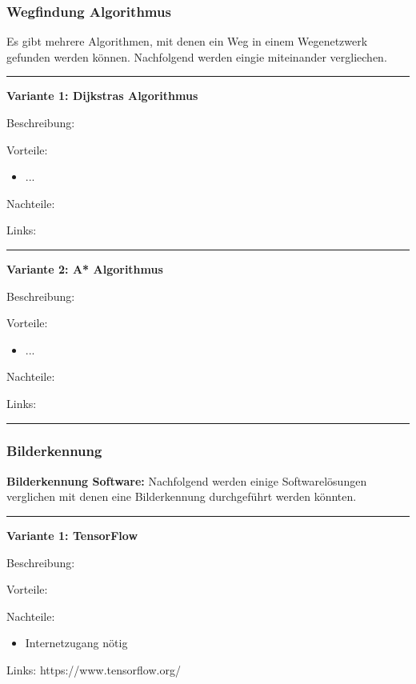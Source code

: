 \subsubsection{Wegfindung Algorithmus}

Es gibt mehrere Algorithmen, mit denen ein Weg in einem Wegenetzwerk gefunden werden können. Nachfolgend werden eingie miteinander vergliechen.

\vspace{10pt}
\hrule

\textbf{Variante 1: Dijkstras Algorithmus}

Beschreibung:

Vorteile:
\begin{itemize}
    \item ...
\end{itemize}

Nachteile:

Links:

\vspace{5pt}
\hrule

\textbf{Variante 2: A* Algorithmus}

Beschreibung:

Vorteile:
\begin{itemize}
    \item ...
\end{itemize}

Nachteile:

Links:

\vspace{5pt}
\hrule




\subsubsection{Bilderkennung}

\textbf{Bilderkennung Software:} Nachfolgend werden einige Softwarelösungen verglichen mit denen eine Bilderkennung durchgeführt werden könnten.

\vspace{10pt}
\hrule
\textbf{Variante 1: TensorFlow}

Beschreibung:

Vorteile:

Nachteile:
\begin{itemize}
    \item Internetzugang nötig
\end{itemize}

Links: https://www.tensorflow.org/

